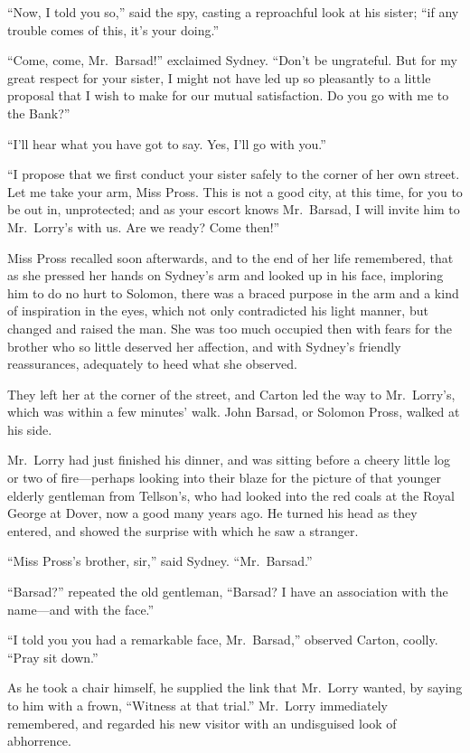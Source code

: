 ``Now, I told you so,'' said the spy, casting a reproachful look at his
sister; ``if any trouble comes of this, it's your doing.''

``Come, come, Mr.\ Barsad!'' exclaimed Sydney.  ``Don't be
ungrateful. But for my great respect for your sister, I might not
have led up so pleasantly to a little proposal that I wish to make
for our mutual satisfaction.  Do you go with me to the Bank?''

``I'll hear what you have got to say.  Yes, I'll go with you.''

``I propose that we first conduct your sister safely to the corner of
her own street.  Let me take your arm, Miss Pross.  This is not a
good city, at this time, for you to be out in, unprotected; and as
your escort knows Mr.\ Barsad, I will invite him to Mr.\ Lorry's with us.
Are we ready?  Come then!''

Miss Pross recalled soon afterwards, and to the end of her life
remembered, that as she pressed her hands on Sydney's arm and looked
up in his face, imploring him to do no hurt to Solomon, there was a
braced purpose in the arm and a kind of inspiration in the eyes,
which not only contradicted his light manner, but changed and raised
the man.  She was too much occupied then with fears for the brother
who so little deserved her affection, and with Sydney's friendly
reassurances, adequately to heed what she observed.

They left her at the corner of the street, and Carton led the way to
Mr.\ Lorry's, which was within a few minutes' walk.  John Barsad, or
Solomon Pross, walked at his side.

Mr.\ Lorry had just finished his dinner, and was sitting before a
cheery little log or two of fire---perhaps looking into their blaze
for the picture of that younger elderly gentleman from Tellson's, who
had looked into the red coals at the Royal George at Dover, now a
good many years ago.  He turned his head as they entered, and showed
the surprise with which he saw a stranger.

``Miss Pross's brother, sir,'' said Sydney.  ``Mr.\ Barsad.''

``Barsad?'' repeated the old gentleman, ``Barsad?  I have an association
with the name---and with the face.''

``I told you you had a remarkable face, Mr.\ Barsad,'' observed Carton,
coolly.  ``Pray sit down.''

As he took a chair himself, he supplied the link that Mr.\ Lorry
wanted, by saying to him with a frown, ``Witness at that trial.''
Mr.\ Lorry immediately remembered, and regarded his new visitor with
an undisguised look of abhorrence.

